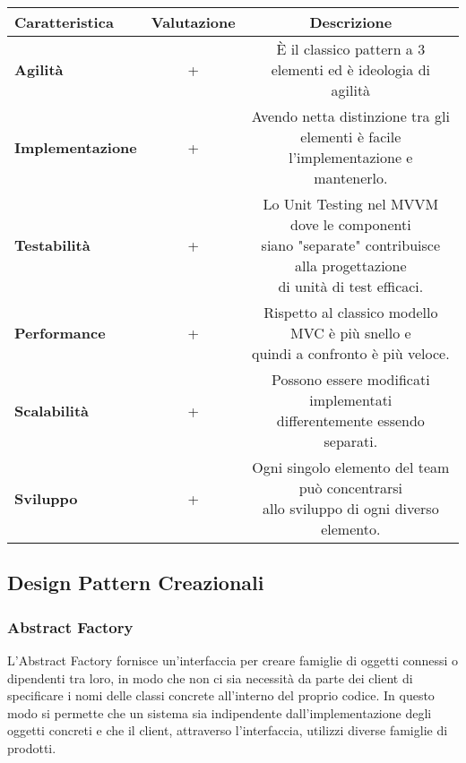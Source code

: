 {{{\begin{itemize}
				\small %
				{\renewcommand\arraystretch{1.2} %
					\begin{tabular}{|l|c|c|}
						\hline
						{\textbf{Caratteristica}}&{\textbf{Valutazione}}&{\textbf{Descrizione}}\\
						\hline
						\textbf{Agilità} & + & È il classico pattern a 3 elementi ed è ideologia di agilità \\
						\hline
						\textbf{Implementazione} & + &  \minitab[c]{Avendo netta distinzione tra gli elementi è facile\\ l'implementazione e mantenerlo.}\\
						\hline
						\textbf{Testabilità} & + &  \minitab[c]{Lo Unit Testing nel MVVM dove le componenti\\ siano "separate" contribuisce alla progettazione\\ di unità di test efficaci.}\\
						\hline
						\textbf{Performance} & + &  \minitab[c]{Rispetto al classico modello MVC è più snello e\\ quindi a confronto è più veloce.}\\
						\hline
						\textbf{Scalabilità} & + &  \minitab[c]{Possono essere modificati implementati\\differentemente essendo separati.} \\
						\hline
						\textbf{Sviluppo} & + &  \minitab[c]{Ogni singolo elemento del team può concentrarsi\\allo sviluppo di ogni diverso elemento.} \\
						\hline
					\end{tabular}
				}
			\end{itemize}
		}
	}
	\subsection{Design Pattern Creazionali}{
		\subsubsection{Abstract Factory}{
			L'Abstract Factory fornisce un'interfaccia per creare famiglie di oggetti connessi o dipendenti tra loro, in modo che non ci sia necessità da parte dei client di specificare i nomi delle classi concrete all'interno del proprio codice.
			In questo modo si permette che un sistema sia indipendente dall'implementazione degli oggetti concreti e che il client, attraverso l'interfaccia, utilizzi diverse famiglie di prodotti.
			
}}}
